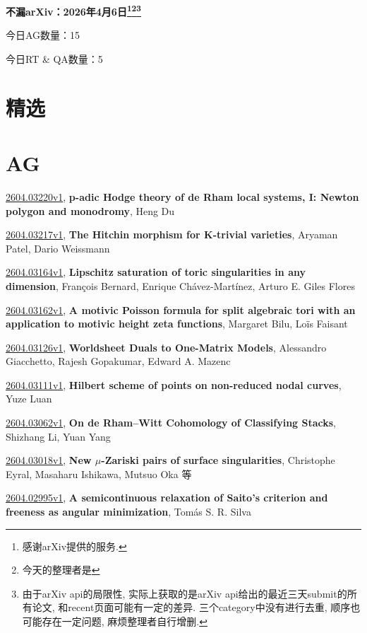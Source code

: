 \documentclass[9pt, a4paper]{article}
\theoremstyle{plain}
\theoremstyle{definition}
\theoremstyle{remark}
\newcommand{\arxiv}[3]{\href{https://arxiv.org/abs/#1}{#1}, \textbf{\textcolor{arxivblue}{#2}}, #3}
\newcommand{\AGnumber}{15}
\newcommand{\RTQAnumber}{5}
\newcommand{\NewestDate}{2026年4月6日}
\newcommand{\todayarXiver}{} %
\begin{document}
\begin{center}
    \Huge\textbf{不漏arXiv：\NewestDate\footnote{感谢arXiv提供的服务.}\footnote{今天的整理者是\todayarXiver}\footnote{由于arXiv api的局限性, 实际上获取的是arXiv api给出的最近三天submit的所有论文, 和recent页面可能有一定的差异. 三个category中没有进行去重, 顺序也可能存在一定问题, 麻烦整理者自行增删.}} \\
\end{center}

\setcounter{section}{-1}

\begin{center}
    今日AG数量：\AGnumber
    
    今日RT \& QA数量：\RTQAnumber
    
\end{center}


\section{精选}


\section{AG}
\arxiv{2604.03220v1}{p-adic Hodge theory of de Rham local systems, I: Newton polygon and monodromy}{Heng Du}

\arxiv{2604.03217v1}{The Hitchin morphism for K-trivial varieties}{Aryaman Patel, Dario Weissmann}

\arxiv{2604.03164v1}{Lipschitz saturation of toric singularities in any dimension}{François Bernard, Enrique Chávez-Martínez, Arturo E. Giles Flores}

\arxiv{2604.03162v1}{A motivic Poisson formula for split algebraic tori with an application to motivic height zeta functions}{Margaret Bilu, Loïs Faisant}

\arxiv{2604.03126v1}{Worldsheet Duals to One-Matrix Models}{Alessandro Giacchetto, Rajesh Gopakumar, Edward A. Mazenc}

\arxiv{2604.03111v1}{Hilbert scheme of points on non-reduced nodal curves}{Yuze Luan}

\arxiv{2604.03062v1}{On de Rham--Witt Cohomology of Classifying Stacks}{Shizhang Li, Yuan Yang}

\arxiv{2604.03018v1}{New $μ$-Zariski pairs of surface singularities}{Christophe Eyral, Masaharu Ishikawa, Mutsuo Oka 等}

\arxiv{2604.02995v1}{A semicontinuous relaxation of Saito's criterion and freeness as angular minimization}{Tomás S. R. Silva}
\end{document}
